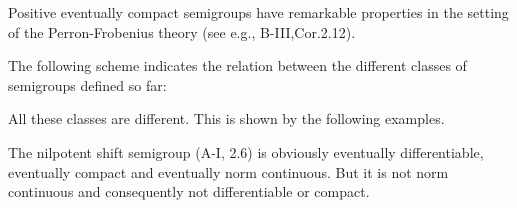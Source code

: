 Positive eventually compact semigroups have remarkable properties in the setting of the Perron-Frobenius theory (see e.g., B-III,Cor.2.12).

The following scheme indicates the relation between the different classes of semigroups defined so far:


All these classes are different.
This is shown by the following examples.

\begin{example}\label{ex:a2-1.27}
The nilpotent shift semigroup (A-I, 2.6) is obviously eventually differentiable, eventually compact and eventually norm continuous.
But it is not norm continuous and consequently not differentiable or compact.
\end{example}

